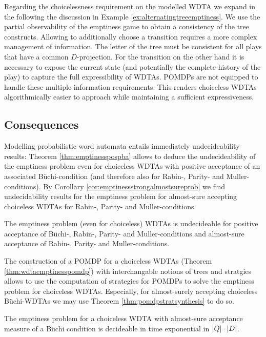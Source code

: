 Regarding the choicelessness requirement on the modelled \ac{WDTA} we expand in
the following the discussion in Example \ref{ex:alternatingtreeemptiness}. We
use the partial observability of the emptiness game to obtain a consistency of
the tree \eve{} constructs. Allowing \eve{} to additionally choose a transition
requires a more complex management of information. The letter of the tree must
be consistent for all plays that have a common $D$-projection. For the
transition on the other hand it is necessary to expose the current state (and
potentially the complete history of the play) to capture the full
expressibility of \acp{WDTA}. \acp{POMDP} are not equipped to handle these
multiple information requirements. This renders choiceless \acp{WDTA}
algorithmically easier to approach while maintaining a sufficient
expressiveness.

\subsection{Consequences}
Modelling probabilistic word automata entails immediately undecideability 
results: Theorem \ref{thm:emptinesspospba} allows to deduce the undecideability
of the emptiness problem even for choiceless \acp{WDTA} with positive
acceptance of an associated Büchi-condition (and therefore also for Rabin-,
Parity- and Muller-conditions). By Corollary
\ref{cor:emptinessstrongalmostsureprob} we find undecidability results for the
emptiness problem for almost-sure accepting choiceless \acp{WDTA} for Rabin-,
Parity- and Muller-conditions.
\begin{corollary}
  The emptiness problem (even for choiceless) \acp{WDTA} is undecideable for
  positive acceptance of Büchi-, Rabin-, Parity- and Muller-conditions and
  almost-sure acceptance of Rabin-, Parity- and Muller-conditions.
\end{corollary}
The construction of a \ac{POMDP} for a choiceless \acp{WDTA}
(Theorem \ref{thm:wdtaemptinesspomdp}) with interchangable notions of trees and
stratgies allows to use the computation of strategies for \acp{POMDP} to solve
the emptiness problem for choiceless \acp{WDTA}. Especially, for almost-surely
accepting choiceless Büchi-\acp{WDTA} we may use Theorem
\ref{thm:pomdpstratsynthesis} to do so.
\begin{corollary}
  The emptiness problem for a choiceless \ac{WDTA} with almost-sure acceptance 
  measure of a Büchi condition is decideable in time exponential in
  $\left\vert{Q}\right\vert\cdot\left\vert{D}\right\vert$.
  \label{cor:emptiness}
\end{corollary}

